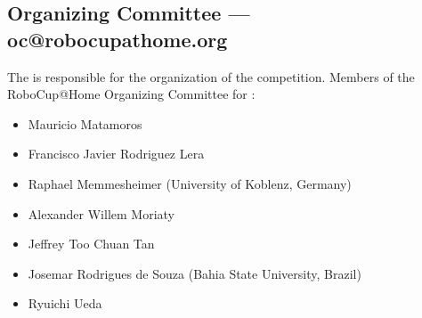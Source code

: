 \subsection{Organizing Committee --- oc@robocupathome.org}
\label{sec:oc}
The  is responsible for the organization of the competition. Members of the RoboCup@Home Organizing Committee for \YEAR:

\begin{itemize}
  \item Mauricio Matamoros 
  \item Francisco Javier Rodriguez Lera 
  \item Raphael Memmesheimer (University of Koblenz, Germany)
  \item Alexander Willem Moriaty 
  \item Jeffrey Too Chuan Tan 
  \item Josemar Rodrigues de Souza (Bahia State University, Brazil)
  \item Ryuichi Ueda
\end{itemize}